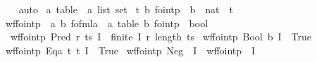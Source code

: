 \begin{isabellebody}
\ \ \isamarkupfalse%
\ auto%
\endisatagproof
{\isafoldproof}%
%
\isadelimproof
\isanewline
%
\endisadelimproof
\isanewline
{}\isamarkupfalse%
\ {\isacharprime}{\kern0pt}a\ table\ {\isacharequal}{\kern0pt}\ {\isachardoublequoteopen}{\isacharparenleft}{\kern0pt}{\isacharprime}{\kern0pt}a\ list{\isacharparenright}{\kern0pt}\ set{\isachardoublequoteclose}\isanewline
\isanewline
{}\isamarkupfalse%
\ {\isacharparenleft}{\kern0pt}{\isacharprime}{\kern0pt}t{\isacharcomma}{\kern0pt}\ {\isacharprime}{\kern0pt}b{\isacharparenright}{\kern0pt}\ fo{\isacharunderscore}{\kern0pt}intp\ {\isacharequal}{\kern0pt}\ {\isachardoublequoteopen}{\isacharprime}{\kern0pt}b\ {\isasymtimes}\ nat\ {\isasymRightarrow}\ {\isacharprime}{\kern0pt}t{\isachardoublequoteclose}\isanewline
\isanewline
{}\isamarkupfalse%
\ wf{\isacharunderscore}{\kern0pt}fo{\isacharunderscore}{\kern0pt}intp\ {\isacharcolon}{\kern0pt}{\isacharcolon}{\kern0pt}\ {\isachardoublequoteopen}{\isacharparenleft}{\kern0pt}{\isacharprime}{\kern0pt}a{\isacharcomma}{\kern0pt}\ {\isacharprime}{\kern0pt}b{\isacharparenright}{\kern0pt}\ fo{\isacharunderscore}{\kern0pt}fmla\ {\isasymRightarrow}\ {\isacharparenleft}{\kern0pt}{\isacharprime}{\kern0pt}a\ table{\isacharcomma}{\kern0pt}\ {\isacharprime}{\kern0pt}b{\isacharparenright}{\kern0pt}\ fo{\isacharunderscore}{\kern0pt}intp\ {\isasymRightarrow}\ bool{\isachardoublequoteclose}\ \isanewline
\ \ {\isachardoublequoteopen}wf{\isacharunderscore}{\kern0pt}fo{\isacharunderscore}{\kern0pt}intp\ {\isacharparenleft}{\kern0pt}Pred\ r\ ts{\isacharparenright}{\kern0pt}\ I\ {\isasymlongleftrightarrow}\ finite\ {\isacharparenleft}{\kern0pt}I\ {\isacharparenleft}{\kern0pt}r{\isacharcomma}{\kern0pt}\ length\ ts{\isacharparenright}{\kern0pt}{\isacharparenright}{\kern0pt}{\isachardoublequoteclose}\isanewline
{\isacharbar}{\kern0pt}\ {\isachardoublequoteopen}wf{\isacharunderscore}{\kern0pt}fo{\isacharunderscore}{\kern0pt}intp\ {\isacharparenleft}{\kern0pt}Bool\ b{\isacharparenright}{\kern0pt}\ I\ {\isasymlongleftrightarrow}\ True{\isachardoublequoteclose}\isanewline
{\isacharbar}{\kern0pt}\ {\isachardoublequoteopen}wf{\isacharunderscore}{\kern0pt}fo{\isacharunderscore}{\kern0pt}intp\ {\isacharparenleft}{\kern0pt}Eqa\ t\ t{\isacharprime}{\kern0pt}{\isacharparenright}{\kern0pt}\ I\ {\isasymlongleftrightarrow}\ True{\isachardoublequoteclose}\isanewline
{\isacharbar}{\kern0pt}\ {\isachardoublequoteopen}wf{\isacharunderscore}{\kern0pt}fo{\isacharunderscore}{\kern0pt}intp\ {\isacharparenleft}{\kern0pt}Neg\ {\isasymphi}{\isacharparenright}{\kern0pt}\ I\ {\isasymlongleftrightarrow}\ wf{\isacharunderscore}{\kern0pt}fo{\isacharunderscore}{\kern0pt}intp\ {\isasymphi}\ I{\isachardoublequoteclose}\isanewline

\end{isabellebody}
